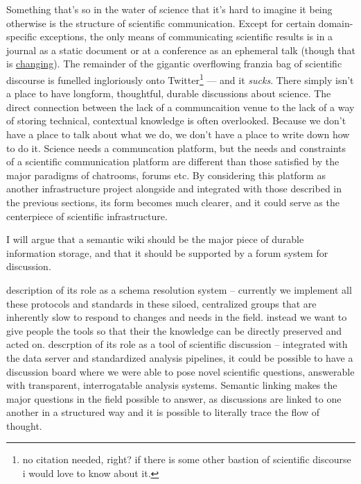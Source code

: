 \documentclass{article}
\begin{document}
Something that's so in the water of science that it's hard to imagine it
being otherwise is the structure of scientific communication. Except for
certain domain-specific exceptions, the only means of communicating
scientific results is in a journal as a static document or at a
conference as an ephemeral talk (though that is
\href{https://neuromatch.io/conference}{changing}). The remainder of the
gigantic overflowing franzia bag of scientific discourse is funelled
ingloriously onto Twitter\footnote{no citation needed, right? if there
  is some other bastion of scientific discourse i would love to know
  about it.} --- and it \emph{sucks}. There simply isn't a place to have
longform, thoughtful, durable discussions about science. The direct
connection between the lack of a communcaition venue to the lack of a
way of storing technical, contextual knowledge is often overlooked.
Because we don't have a place to talk about what we do, we don't have a
place to write down how to do it. Science needs a communcation platform,
but the needs and constraints of a scientific communication platform are
different than those satisfied by the major paradigms of chatrooms,
forums etc. By considering this platform as another infrastructure
project alongside and integrated with those described in the previous
sections, its form becomes much clearer, and it could serve as the
centerpiece of scientific infrastructure.

I will argue that a semantic wiki should be the major piece of durable
information storage, and that it should be supported by a forum system
for discussion.

\begin{leftbar}
description of its role as a schema resolution system -- currently we
implement all these protocols and standards in these siloed, centralized
groups that are inherently slow to respond to changes and needs in the
field. instead we want to give people the tools so that their the
knowledge can be directly preserved and acted on. descrption of its role
as a tool of scientific discussion -- integrated with the data server
and standardized analysis pipelines, it could be possible to have a
discussion board where we were able to pose novel scientific questions,
answerable with transparent, interrogatable analysis systems. Semantic
linking makes the major questions in the field possible to answer, as
discussions are linked to one another in a structured way and it is
possible to literally trace the flow of thought.
\end{leftbar}
\end{document}
